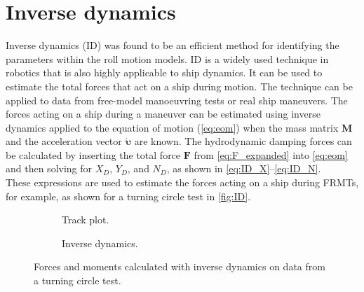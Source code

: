\section{Inverse dynamics} \label{sec:ID}
Inverse dynamics (ID) was found to be an efficient method for identifying the parameters within the roll motion models. ID is a widely used technique in robotics \cite{faberInverseDynamicsMechanical2018, haningerNonparametricInverseDynamic2019, mastalliInverseDynamicsMPCNullspace2023, sunHighorderInverseDynamics2023, kurtzInverseDynamicsTrajectory2023} that is also highly applicable to ship dynamics. It can be used to estimate the total forces that act on a ship during motion. The technique can be applied to data from free-model manoeuvring tests or real ship maneuvers. The forces acting on a ship during a maneuver can be estimated using inverse dynamics applied to the equation of motion (\autoref{eq:eom}) when the mass matrix $\mathbf{M}$ and the acceleration vector $\pmb{\dot{\upsilon}}$ are known. The hydrodynamic damping forces can be calculated by inserting the total force $\mathbf{F}$ from \autoref{eq:F_expanded} into \autoref{eq:eom} and then solving for $X_D$, $Y_D$, and $N_D$, as shown in \autoref{eq:ID_X}--\autoref{eq:ID_N}.
\begin{equation}
    \label{eq:ID_X}
    
\end{equation}
\begin{equation}
    \label{eq:ID_Y}
    
\end{equation}
\begin{equation}
    \label{eq:ID_N}
    
\end{equation}
These expressions are used to estimate the forces acting on a ship during FRMTs, for example, as shown for a turning circle test in \autoref{fig:ID}.
\begin{figure}[h]
     \centering
     \begin{subfigure}[b]{0.49\textwidth}
         \centering
         
        \caption{Track plot.}
        \label{fig:sim_optiwise_10_port}
     \end{subfigure}
     \hfill
     \begin{subfigure}[b]{0.49\textwidth}
         
        \caption{Inverse dynamics.}
        \label{fig:sim_optiwise_10_stbd}
     \end{subfigure}
    \caption{Forces and moments calculated with inverse dynamics on data from a turning circle test.}
    \label{fig:ID}
\end{figure}
